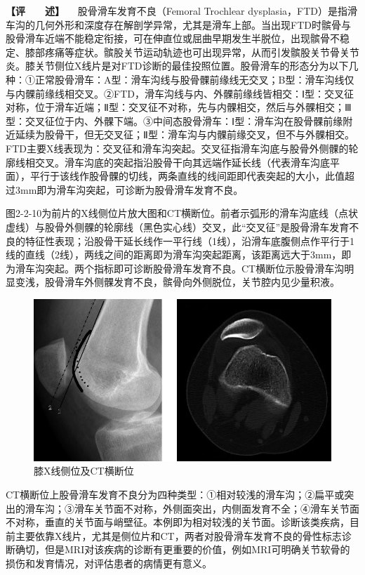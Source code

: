 \textbf{【评　　述】} 　股骨滑车发育不良（Femoral Trochlear
dysplasia，FTD）是指滑车沟的几何外形和深度存在解剖学异常，尤其是滑车上部。当出现FTD时髌骨与股骨滑车近端不能稳定衔接，可在伸直位或屈曲早期发生半脱位，出现髌骨不稳定、膝部疼痛等症状。髌股关节运动轨迹也可出现异常，从而引发髌股关节骨关节炎。膝关节侧位X线片是对FTD诊断的最佳投照位置。股骨滑车的形态分为以下几种：①正常股骨滑车：A型：滑车沟线与股骨髁前缘线无交叉；B型：滑车沟线仅与内髁前缘线相交叉。②FTD，滑车沟线与内、外髁前缘线皆相交：Ⅰ型：交叉征对称，位于滑车近端；Ⅱ型：交叉征不对称，先与内髁相交，然后与外髁相交；Ⅲ型：交叉征位于内、外髁下端。③中间态股骨滑车：Ⅰ型：滑车沟在股骨髁前缘附近延续为股骨干，但无交叉征；Ⅱ型：滑车沟与内髁前缘交叉，但不与外髁相交。FTD主要X线表现为：交叉征和滑车沟突起。交叉征指滑车沟底与股骨外侧髁的轮廓线相交叉。滑车沟底的突起指沿股骨干向其远端作延长线（代表滑车沟底平面），平行于该线作股骨髁的切线，两条直线的线间距即代表突起的大小，此值超过3mm即为滑车沟突起，可诊断为股骨滑车发育不良。

图2-2-10为前片的X线侧位片放大图和CT横断位。前者示弧形的滑车沟底线（点状虚线）与股骨外侧髁的轮廓线（黑色实心线）交叉，此“交叉征”是股骨滑车发育不良的特征性表现；沿股骨干延长线作一平行线（1线），沿滑车底腹侧点作平行于1线的直线（2线），两线之间的距离即为滑车沟突起距离，该距离远大于3mm，即为滑车沟突起。两个指标即可诊断股骨滑车发育不良。CT横断位示股骨滑车沟明显变浅，股骨滑车外侧髁发育不良，髌骨向外侧脱位，关节腔内见少量积液。

\begin{figure}[!htbp]
 \centering
 \includegraphics{./images/Image00027.jpg}
 \captionsetup{justification=centering}
 \caption{膝X线侧位及CT横断位}
 \label{fig2-2-10}
  \end{figure} 

CT横断位上股骨滑车发育不良分为四种类型：①相对较浅的滑车沟；②扁平或突出的滑车沟；③滑车关节面不对称，外侧面突出，内侧面发育不全；④滑车关节面不对称，垂直的关节面与峭壁征。本例即为相对较浅的关节面。诊断该类疾病，目前主要依靠X线片，尤其是侧位片和CT，两者对股骨滑车发育不良的骨性标志诊断确切，但是MRI对该疾病的诊断有更重要的价值，例如MRI可明确关节软骨的损伤和发育情况，对评估患者的病情更有意义。


